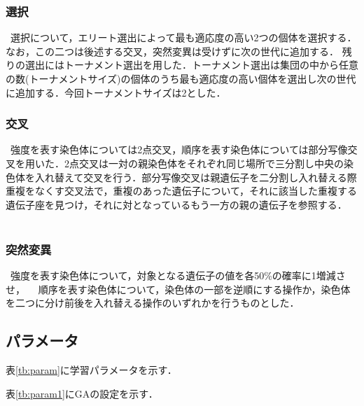 \documentclass[twocolumn]{jarticle}     %
\begin{document}
\subsubsection{選択}
\ 選択について，エリート選出によって最も適応度の高い2つの個体を選択する．なお，この二つは後述する交叉，突然変異は受けずに次の世代に追加する．
残りの選出にはトーナメント選出を用した．トーナメント選出は集団の中から任意の数(トーナメントサイズ)の個体のうち最も適応度の高い個体を選出し次の世代に追加する．今回トーナメントサイズは2とした．
　
\subsubsection{交叉}
\ 強度を表す染色体については2点交叉，順序を表す染色体については部分写像交叉を用いた．2点交叉は一対の親染色体をそれぞれ同じ場所で三分割し中央の染色体を入れ替えて交叉を行う．部分写像交叉は親遺伝子を二分割し入れ替える際重複をなくす交叉法で，重複のあった遺伝子について，それに該当した重複する遺伝子座を見つけ，それに対となっているもう一方の親の遺伝子を参照する．
　
\subsubsection{突然変異}
\ 強度を表す染色体について，対象となる遺伝子の値を各50\%の確率に1増減させ，
　順序を表す染色体について，染色体の一部を逆順にする操作か，染色体を二つに分け前後を入れ替える操作のいずれかを行うものとした．
　
\subsection{パラメータ}
表\ref{tb:param}に学習パラメータを示す．
\begin{table}[h]
	\centering
	\caption{学習パラメータ\label{tb:param}}
\end{table}
 表\ref{tb:param1}にGAの設定を示す．
\begin{table}[h]
	\centering
	\caption{実験パラメータ\label{tb:param1}}
\end{table}
\end{document}

